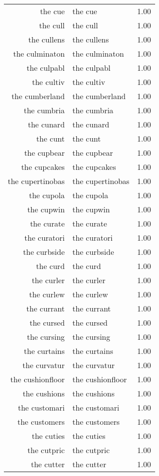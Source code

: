 \begin{table}[ht]
\begin{tabular}{rlr}
  the cue & the cue & 1.00 \\ 
  the cull & the cull & 1.00 \\ 
  the cullens & the cullens & 1.00 \\ 
  the culminaton & the culminaton & 1.00 \\ 
  the culpabl & the culpabl & 1.00 \\ 
  the cultiv & the cultiv & 1.00 \\ 
  the cumberland & the cumberland & 1.00 \\ 
  the cumbria & the cumbria & 1.00 \\ 
  the cunard & the cunard & 1.00 \\ 
  the cunt & the cunt & 1.00 \\ 
  the cupbear & the cupbear & 1.00 \\ 
  the cupcakes & the cupcakes & 1.00 \\ 
  the cupertinobas & the cupertinobas & 1.00 \\ 
  the cupola & the cupola & 1.00 \\ 
  the cupwin & the cupwin & 1.00 \\ 
  the curate & the curate & 1.00 \\ 
  the curatori & the curatori & 1.00 \\ 
  the curbside & the curbside & 1.00 \\ 
  the curd & the curd & 1.00 \\ 
  the curler & the curler & 1.00 \\ 
  the curlew & the curlew & 1.00 \\ 
  the currant & the currant & 1.00 \\ 
  the cursed & the cursed & 1.00 \\ 
  the cursing & the cursing & 1.00 \\ 
  the curtains & the curtains & 1.00 \\ 
  the curvatur & the curvatur & 1.00 \\ 
  the cushionfloor & the cushionfloor & 1.00 \\ 
  the cushions & the cushions & 1.00 \\ 
  the customari & the customari & 1.00 \\ 
  the customers & the customers & 1.00 \\ 
  the cuties & the cuties & 1.00 \\ 
  the cutpric & the cutpric & 1.00 \\ 
  the cutter & the cutter & 1.00 \\ 

\end{tabular}
\end{table}
